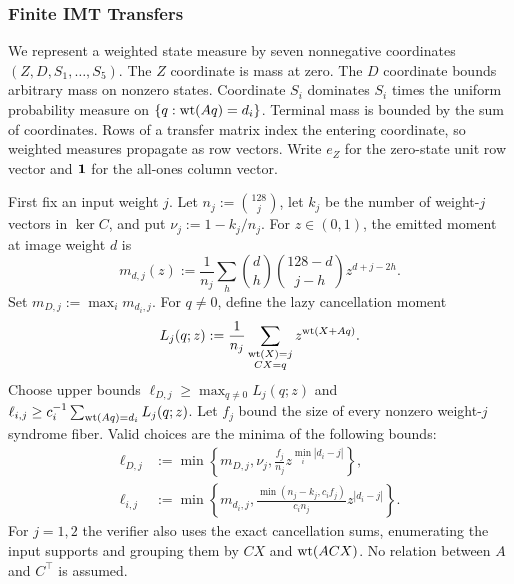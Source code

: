 \subsubsection{Finite IMT Transfers}
\label{app:imt-finite-transfers}

We represent a weighted state measure by seven nonnegative coordinates
$(Z,D,S_1,\ldots,S_5)$. The $Z$ coordinate is mass at zero. The $D$
coordinate bounds arbitrary mass on nonzero states. Coordinate $S_i$
dominates $S_i$ times the uniform probability measure on
$\{q:\operatorname{wt}(Aq)=d_i\}$. Terminal mass is bounded by the sum of coordinates.
Rows of a transfer matrix index the entering coordinate, so weighted
measures propagate as row vectors. Write $e_Z$ for the zero-state unit row
vector and $\mathbf 1$ for the all-ones column vector.

First fix an input weight $j$. Let $n_j:=\binom{128}{j}$, let $k_j$ be the
number of weight-$j$ vectors in $\ker C$, and put $\nu_j:=1-k_j/n_j$.
For $z\in(0,1)$, the emitted moment at image weight $d$ is
\[
 m_{d,j}(z):=\frac1{n_j}\sum_h
 \binom dh\binom{128-d}{j-h}z^{d+j-2h}.
\]
Set $m_{D,j}:=\max_i m_{d_i,j}$. For $q\ne0$, define the lazy
cancellation moment
\[
 L_j(q;z):=\frac1{n_j}\sum_{\substack{\operatorname{wt}(X)=j\\CX=q}}
 z^{\operatorname{wt}(X+Aq)}.
\]
Choose upper bounds $\ell_{D,j}\ge\max_{q\ne0}L_j(q;z)$ and
$\ell_{i,j}\ge c_i^{-1}\sum_{\operatorname{wt}(Aq)=d_i}L_j(q;z)$.
Let $f_j$ bound the size of every nonzero weight-$j$ syndrome fiber. Valid
choices are the minima of the following bounds:
\begin{align*}
 \ell_{D,j}&:=
 \min\left\{m_{D,j},\nu_j,
 \frac{f_j}{n_j}z^{\min_i|d_i-j|}\right\},\\
 \ell_{i,j}&:=
 \min\left\{m_{d_i,j},
 \frac{\min(n_j-k_j,c_i f_j)}{c_i n_j}z^{|d_i-j|}\right\}.
\end{align*}
For $j=1,2$ the verifier also uses the exact cancellation sums, enumerating
the input supports and grouping them by $CX$ and $\operatorname{wt}(ACX)$. No relation
between $A$ and $C^\top$ is assumed.

